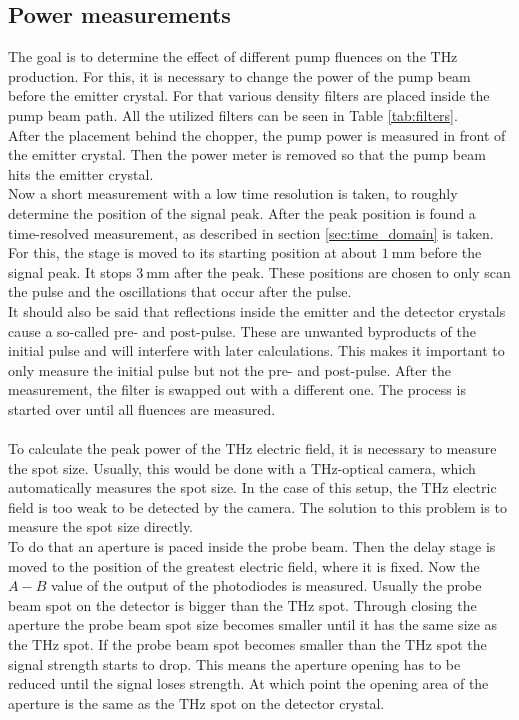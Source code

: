 \subsection{Power measurements}
\label{sec:power}
The goal is to determine the effect of different pump fluences on the $\si{\tera\hertz}$ production.
For this, it is necessary to change the power of the pump beam before the emitter crystal.
For that various density filters are placed inside the pump beam path.
All the utilized filters can be seen in Table \ref{tab:filters}.
\\
After the placement behind the chopper, the pump power is measured in front of the emitter crystal.
Then the power meter is removed so that the pump beam hits the emitter crystal.
\\
Now a short measurement with a low time resolution is taken, to roughly determine the position of the signal peak.
After the peak position is found a time-resolved measurement, as described in section \ref{sec:time_domain} is taken.
For this, the stage is moved to its starting position at about $\SI{1}{\milli\meter}$ before the signal peak.
It stops $\SI{3}{\milli\meter}$ after the peak.
These positions are chosen to only scan the pulse and the oscillations that occur after the pulse.
\\
It should also be said that reflections inside the emitter and the detector crystals cause a so-called pre- and post-pulse.
These are unwanted byproducts of the initial pulse and will interfere with later calculations.
This makes it important to only measure the initial pulse but not the pre- and post-pulse.
After the measurement, the filter is swapped out with a different one.
The process is started over until all fluences are measured.
\\\\
To calculate the peak power of the $\si{\tera\hertz}$ electric field, it is necessary to measure the spot size.
Usually, this would be done with a $\si{\tera\hertz}$-optical camera, which automatically measures the spot size.
In the case of this setup, the $\si{\tera\hertz}$ electric field is too weak to be detected by the camera.
The solution to this problem is to measure the spot size directly.
\\
To do that an aperture is paced inside the probe beam.
Then the delay stage is moved to the position of the greatest electric field, where it is fixed.
Now the $A-B$ value of the output of the photodiodes is measured.
Usually the probe beam spot on the detector is bigger than the $\si{\tera\hertz}$ spot.
Through closing the aperture the probe beam spot size becomes smaller until it has the same size as the $\si{\tera\hertz}$ spot.
If the probe beam spot becomes smaller than the $\si{\tera\hertz}$ spot the signal strength starts to drop.
This means the aperture opening has to be reduced until the signal loses strength. 
At which point the opening area of the aperture is the same as the $\si{\tera\hertz}$ spot on the detector crystal.
